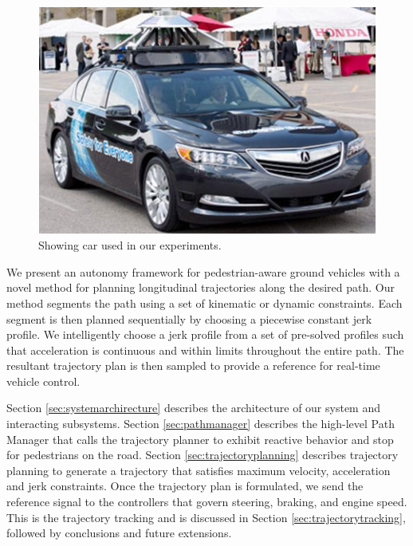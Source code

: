 \documentclass[letterpaper, 10 pt, conference]{ieeeconf}  %
\begin{document}
\begin{figure}[tb]
  \centering
  \includegraphics[width=0.6\columnwidth]{graphics/its_car.png}
  \caption{
    Showing car used in our experiments.
  }
  \label{fig:car}
\end{figure}

We present an autonomy framework for pedestrian-aware ground vehicles
with a novel method for planning longitudinal trajectories 
along the desired path. %
Our method segments the path using a set of kinematic or dynamic constraints.
Each segment is then planned sequentially by choosing a piecewise constant jerk profile.
We intelligently choose a jerk profile from a set of pre-solved profiles such that acceleration is continuous and within limits throughout the entire path.
The resultant trajectory plan is then sampled to provide a reference for real-time vehicle control. %

Section \ref{sec:systemarchirecture} describes the architecture of our system and interacting subsystems.
Section \ref{sec:pathmanager} describes the high-level Path Manager that calls the trajectory planner to 
exhibit reactive behavior and stop for pedestrians on the road.
Section \ref{sec:trajectoryplanning} describes trajectory planning to generate a trajectory that satisfies maximum velocity, acceleration and jerk constraints. 
Once the trajectory plan is formulated, we send the reference signal to the controllers that govern steering, braking, and engine speed.
This is the trajectory tracking and is discussed in Section \ref{sec:trajectorytracking},
followed by conclusions and future extensions.
\end{document}

